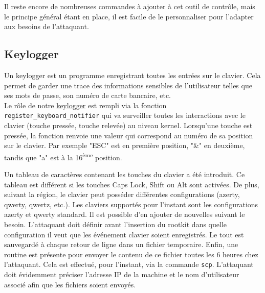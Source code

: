 \documentclass[12pt]{article}
\begin{document}
        Il reste encore de nombreuses commandes à ajouter à cet outil de contrôle, mais le principe général étant en place, il est facile de le personnaliser pour l'adapter aux besoins de l'attaquant.

    \subsection{Keylogger}
        
        Un keylogger est un programme enregistrant toutes les entrées sur le clavier. Cela permet de garder une trace des informations sensibles de l'utilisateur telles que ses mots de passe, son numéro de carte bancaire, etc. \\ 
        
        
        Le rôle de notre \href{https://github.com/QuokkaLight/rkduck/blob/master/rkduck/keylogger.c}{keylogger} est rempli via la fonction \texttt{register\_keyboard\_notifier} qui va surveiller toutes les interactions avec le clavier (touche pressée, touche relevée) au niveau kernel. Lorsqu'une touche est pressée, la fonction renvoie une valeur qui correspond au numéro de sa position sur le clavier. Par exemple "ESC" est en première position, "\&" en deuxième, tandis que "a" est à la 16\textsuperscript{ème} position.
        
        Un tableau de caractères contenant les touches du clavier a été introduit. Ce tableau est différent si les touches Caps Lock, Shift ou Alt sont activées. De plus, suivant la région, le clavier peut posséder différentes configurations (azerty, qwerty, qwertz, etc.). Les claviers supportés pour l'instant sont les configurations azerty et qwerty standard. Il est possible d'en ajouter de nouvelles suivant le besoin. L'attaquant doit définir avant l'insertion du rootkit dans quelle configuration il veut que les événement clavier soient enregistrés. Le tout est sauvegardé à chaque retour de ligne dans un fichier temporaire.         
        Enfin, une routine est présente pour envoyer le contenu de ce fichier toutes les 6 heures chez l'attaquant. Cela est effectué, pour l'instant, via la commande \texttt{scp}. L'attaquant doit évidemment préciser l'adresse IP de la machine et le nom d'utilisateur associé afin que les fichiers soient envoyés.
                
\end{document}
